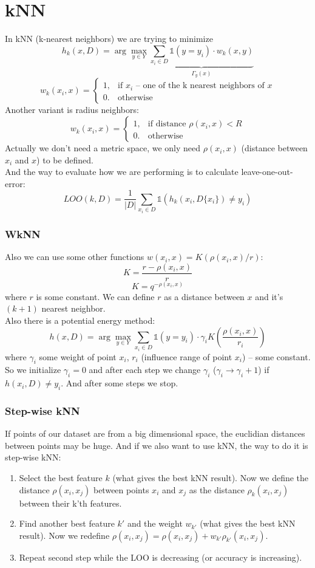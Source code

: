 \section{kNN}

In kNN (k-nearest neighbors) we are trying to minimize
$$h_k(x, D)=\arg\max\limits_{y\in Y}\underbrace{\sum\limits_{x_i\in D}\mathbb{1}(y=y_i)\cdot w_k(x,y)}_{\Gamma_y(x)}$$
$$w_k(x_i,x)=\begin{cases}
	1, & \text{if $x_i$ -- one of the k nearest neighbors of $x$} \\
	0. & \text{otherwise}
\end{cases}
$$
Another variant is radius neighbors:
$$w_k(x_i,x)=\begin{cases}
	1, & \text{if distance $\rho(x_i,x)<R$} \\
	0. & \text{otherwise}
\end{cases}
$$
Actually we don't need a metric space, we only need $\rho(x_i, x)$ (distance between $x_i$ and $x$) to be defined. \\
And the way to evaluate how we are performing is to calculate leave-one-out-error:
$$LOO(k,D)=\frac{1}{|D|}\sum\limits_{x_i\in D}\mathbb{1}(h_k(x_i,D\{x_i\})\ne y_i)$$

\subsubsection*{WkNN}

Also we can use some other functions $w(x_i,x)=K(\rho(x_i,x)/r)$:
$$K=\frac{r-\rho(x_i,x)}{r}$$
$$K=q^{-\rho(x_i,x)}$$
where $r$ is some constant. We can define $r$ as a distance between $x$ and it's $(k+1)$ nearest neighbor.\\
Also there is a potential energy method:
$$h(x, D)=\arg\max\limits_{y\in Y}\sum\limits_{x_i\in D}\mathbb{1}(y=y_i)\cdot\gamma_i K\left(\frac{\rho(x_i,x)}{r_i}\right)$$
where $\gamma_i$ some weight of point $x_i$, $r_i$ (influence range of point $x_i$) -- some constant. So we initialize $\gamma_i=0$ and after each step we change $\gamma_i$ ($\gamma_i\to\gamma_i+1$) if $h(x_i, D)\ne y_i$. And after some steps we stop.

\subsubsection*{Step-wise kNN}

If points of our dataset are from a big dimensional space, the euclidian distances between points may be huge. And if we also want to use kNN, the way to do it is step-wise kNN:
\begin{enumerate}
	\item Select the best feature $k$ (what gives the best kNN result). Now we define the distance $\rho(x_i, x_j)$ between points $x_i$ and $x_j$ as the distance $\rho_k(x_i,x_j)$ between their k'th features.
	\item Find another best feature $k'$ and the weight $w_{k'}$ (what gives the best kNN result). Now we redefine $\rho(x_i,x_j)=\rho(x_i,x_j)+w_{k'}\rho_{k'}(x_i,x_j)$.
	\item Repeat second step while the LOO is decreasing (or accuracy is increasing).
\end{enumerate}